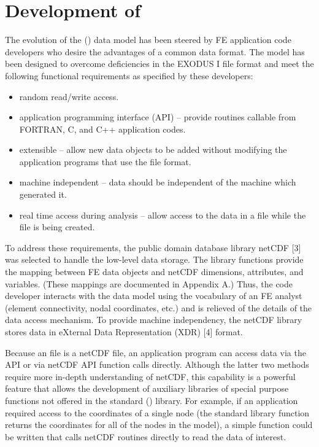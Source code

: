 \chapter{Development of \exo{}}


The evolution of the \exo() data model has been steered by 
FE application code developers who desire the advantages of a 
common data format. The \exo{} model has been designed to 
overcome deficiencies in the EXODUS I file format and meet the 
following functional requirements as specified by these developers:

\begin{itemize}
 \item random read/write access.

 \item application programming interface (API) -- provide 
routines callable from FORTRAN, C, and C++ application codes.

 \item extensible -- allow new data objects to be added 
without modifying the application programs that use the file 
format.

 \item {machine independent -- data should be independent 
of the machine which generated it.}

 \item {real time access during analysis -- allow access 
to the data in a file while the file is being created.}
\end{itemize}


To address these requirements, the public domain database library
netCDF [3] was selected to handle the low-level data storage. The
\exo{} library functions provide the mapping between FE data objects
and netCDF dimensions, attributes, and variables. (These mappings are
documented in Appendix A.) Thus, the code developer interacts with the
data model using the vocabulary of an FE analyst (element
connectivity, nodal coordinates, etc.) and is relieved of the details
of the data access mechanism. To provide machine independency, the
netCDF library stores data in eXternal Data Representation (XDR) [4]
format.


Because an \exo{} file is a netCDF file, an application program can
access data via the \exo{} API or via netCDF API function calls
directly. Although the latter two methods require more in-depth
understanding of netCDF, this capability is a powerful
feature that allows the development of auxiliary libraries of special
purpose functions not offered in the standard \exo() library. For
example, if an application required access to the coordinates of a
single node (the standard library function returns the coordinates for
all of the nodes in the model), a simple function could be written
that calls netCDF routines directly to read the data of interest.



